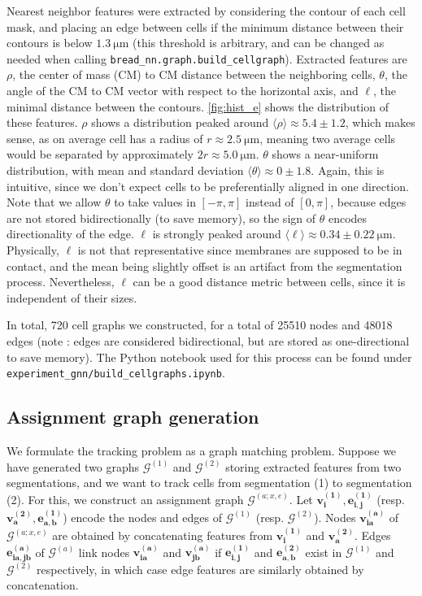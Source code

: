 \documentclass[10pt,conference,compsocconf,a4paper]{IEEEtran}
\newcommand{\G}{\mathcal{G}}
\renewcommand{\vec}[1]{\boldsymbol{#1}}
\newcommand{\nunit}[1]{\ \si{#1}}
\newcommand{\avg}[1]{\langle{#1}\rangle}
\newcommand*{\shortautoref}[1]{%
	\begingroup
	\def\equationautorefname{\textsc{Eq.}}%
	\def\tableautorefname{\textsc{Tab.}}%
	\def\figureautorefname{\textsc{Fig.}}%
	\autoref{#1}%
	\endgroup
}
\begin{document}
		Nearest neighbor features were extracted by considering the contour of each cell mask, and placing an edge between cells if the minimum distance between their contours is below $1.3 \nunit{\micro \meter}$ (this threshold is arbitrary, and can be changed as needed when calling \texttt{bread\_nn.graph.build\_cellgraph}). Extracted features are $\rho$, the center of mass (CM) to CM distance between the neighboring cells, $\theta$, the angle of the CM to CM vector with respect to the horizontal axis, and $\ell$, the minimal distance between the contours. \shortautoref{fig:hist_e} shows the distribution of these features. $\rho$ shows a distribution peaked around $\avg{\rho} \approx 5.4 \pm 1.2$, which makes sense, as on average cell has a radius of $r \approx 2.5 \nunit{\micro \meter}$, meaning two average cells would be separated by approximately $2r \approx 5.0 \nunit{\micro \meter}$. $\theta$ shows a near-uniform distribution, with mean and standard deviation $\avg{\theta} \approx 0 \pm 1.8$. Again, this is intuitive, since we don't expect cells to be preferentially aligned in one direction. Note that we allow $\theta$ to take values in $[-\pi, \pi]$ instead of $[0, \pi]$, because edges are not stored bidirectionally (to save memory), so the sign of $\theta$ encodes directionality of the edge. $\ell$ is strongly peaked around $\avg{\ell} \approx 0.34 \pm 0.22 \nunit{\micro \meter}$. Physically, $\ell$ is not that representative since membranes are supposed to be in contact, and the mean being slightly offset is an artifact from the segmentation process. Nevertheless, $\ell$ can be a good distance metric between cells, since it is independent of their sizes.

		In total, 720 cell graphs we constructed, for a total of 25510 nodes and 48018 edges (note : edges are considered bidirectional, but are stored as one-directional to save memory). The Python notebook used for this process can be found under \texttt{experiment\_gnn/build\_cellgraphs.ipynb}.

	\subsection{Assignment graph generation}

		We formulate the tracking problem as a graph matching problem. Suppose we have generated two graphs $\G^{(1)}$ and $\G^{(2)}$ storing extracted features from two segmentations, and we want to track cells from segmentation (1) to segmentation (2). For this, we construct an assignment graph $\G^{(a;x,e)}$. Let $\vec{v_i^{(1)}}, \vec{e_{i,j}^{(1)}}$ (resp. $\vec{v_a^{(2)}}, \vec{e_{a,b}^{(1)}}$) encode the nodes and edges of $\G^{(1)}$ (resp. $\G^{(2)}$). Nodes $\vec{v_{ia}^{(a)}}$ of $\G^{(a;x,e)}$ are obtained by concatenating features from $\vec{v_i^{(1)}}$ and $\vec{v_a^{(2)}}$. Edges $\vec{e_{ia,jb}^{(a)}}$ of $\G^{(a)}$ link nodes $\vec{v_{ia}^{(a)}}$ and $\vec{v_{jb}^{(a)}}$ if $\vec{e_{i,j}^{(1)}}$ and $\vec{e_{a,b}^{(2)}}$ exist in $\G^{(1)}$ and $\G^{(2)}$ respectively, in which case edge features are similarly obtained by concatenation.
\end{document}

